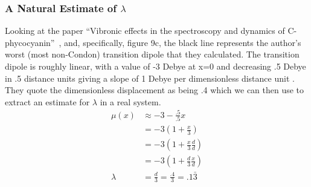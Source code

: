 \subsubsection{A Natural Estimate of $\lambda$}
Looking at the paper ``Vibronic effects in the spectroscopy and dynamics of C-phycocyanin''~\cite{photosyntheticKappa}, and, specifically, figure 9c, the black line represents the author's worst (most non-Condon) transition dipole that they calculated.  The transition dipole is roughly linear, with a value of -3 Debye at x=0 and decreasing .5 Debye in .5 distance units giving a slope of 1 Debye per dimensionless distance unit .  They quote the dimensionless displacement as being .4 which we can then use to extract an estimate for $\lambda$ in a real system.
\begin{align*}
	\mu (x) &\approx -3 - \frac{.5}{.5} x \\
	&= -3 \left(  1 + \frac{x}{3}\right)\\
	&= -3 \left(  1 + \frac{x}{3} \frac{d}{d}\right) \\
	&= -3 \left(  1 +  \frac{d}{3} \frac{x}{d}\right) \\
	\lambda &= \frac{d}{3} = \frac{.4}{3} = .1\bar{3}
\end{align*}



%
%
